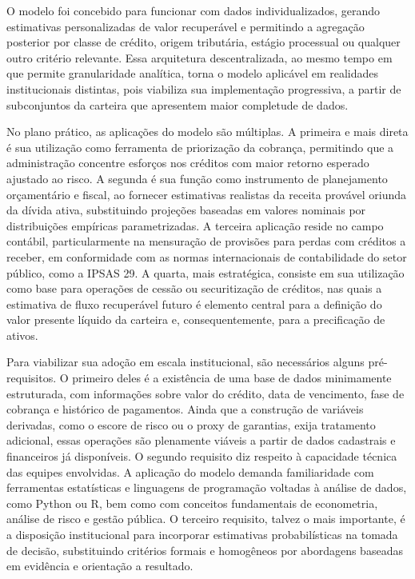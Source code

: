 \documentclass[a4paper,12pt]{article}
\begin{document}
O modelo foi concebido para funcionar com dados individualizados, gerando estimativas personalizadas de valor recuperável e permitindo a agregação posterior por classe de crédito, origem tributária, estágio processual ou qualquer outro critério relevante. Essa arquitetura descentralizada, ao mesmo tempo em que permite granularidade analítica, torna o modelo aplicável em realidades institucionais distintas, pois viabiliza sua implementação progressiva, a partir de subconjuntos da carteira que apresentem maior completude de dados.

No plano prático, as aplicações do modelo são múltiplas. A primeira e mais direta é sua utilização como ferramenta de priorização da cobrança, permitindo que a administração concentre esforços nos créditos com maior retorno esperado ajustado ao risco. A segunda é sua função como instrumento de planejamento orçamentário e fiscal, ao fornecer estimativas realistas da receita provável oriunda da dívida ativa, substituindo projeções baseadas em valores nominais por distribuições empíricas parametrizadas. A terceira aplicação reside no campo contábil, particularmente na mensuração de provisões para perdas com créditos a receber, em conformidade com as normas internacionais de contabilidade do setor público, como a IPSAS 29. A quarta, mais estratégica, consiste em sua utilização como base para operações de cessão ou securitização de créditos, nas quais a estimativa de fluxo recuperável futuro é elemento central para a definição do valor presente líquido da carteira e, consequentemente, para a precificação de ativos.

Para viabilizar sua adoção em escala institucional, são necessários alguns pré-requisitos. O primeiro deles é a existência de uma base de dados minimamente estruturada, com informações sobre valor do crédito, data de vencimento, fase de cobrança e histórico de pagamentos. Ainda que a construção de variáveis derivadas, como o escore de risco ou o proxy de garantias, exija tratamento adicional, essas operações são plenamente viáveis a partir de dados cadastrais e financeiros já disponíveis. O segundo requisito diz respeito à capacidade técnica das equipes envolvidas. A aplicação do modelo demanda familiaridade com ferramentas estatísticas e linguagens de programação voltadas à análise de dados, como Python ou R, bem como com conceitos fundamentais de econometria, análise de risco e gestão pública. O terceiro requisito, talvez o mais importante, é a disposição institucional para incorporar estimativas probabilísticas na tomada de decisão, substituindo critérios formais e homogêneos por abordagens baseadas em evidência e orientação a resultado.
\end{document}
